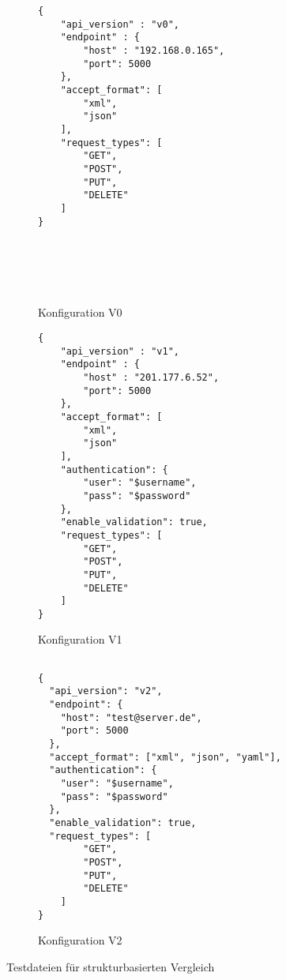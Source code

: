\begin{figure}[!htb]
\centering
\begin{subfigure}[t]{.45\textwidth}
  \begin{verbatim}
{
    "api_version" : "v0",
    "endpoint" : {
        "host" : "192.168.0.165",
        "port": 5000
    },
    "accept_format": [
        "xml",
        "json"
    ],
    "request_types": [
        "GET",
        "POST",
        "PUT",
        "DELETE"
    ]
}
 
 

 
 
  \end{verbatim}
  \caption{Konfiguration V0}
  \label{fig:sub1}
\end{subfigure}
\begin{subfigure}[t]{.45\textwidth}
\begin{verbatim}
{
    "api_version" : "v1",
    "endpoint" : {
        "host" : "201.177.6.52",
        "port": 5000
    },
    "accept_format": [
        "xml",
        "json"
    ],
    "authentication": {
        "user": "$username",
        "pass": "$password"
    },
    "enable_validation": true,
    "request_types": [
        "GET",
        "POST",
        "PUT",
        "DELETE"
    ]
}
\end{verbatim}
  \caption{Konfiguration V1}
  \label{fig:sub2}
\end{subfigure}
\begin{subfigure}{.45\textwidth}
\begin{verbatim}

{
  "api_version": "v2",
  "endpoint": {
    "host": "test@server.de",
    "port": 5000
  },
  "accept_format": ["xml", "json", "yaml"],
  "authentication": {
    "user": "$username",
    "pass": "$password"
  },
  "enable_validation": true,
  "request_types": [
        "GET",
        "POST",
        "PUT",
        "DELETE"
    ]
}

\end{verbatim}
  \caption{Konfiguration V2}
  \label{fig:sub2}
\end{subfigure}
\caption{Testdateien für strukturbasierten Vergleich}
\label{fig:structCompJson}
\end{figure}


